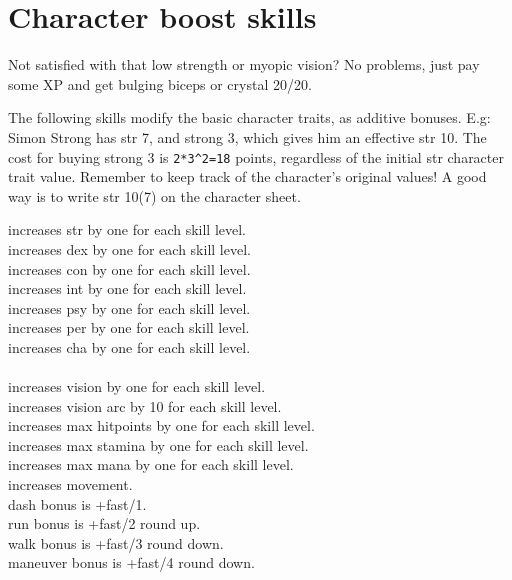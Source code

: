 \closeskillslist

















\section*{Character boost skills}

Not satisfied with that low strength or myopic vision? No problems, just pay some XP and get bulging biceps or crystal 20/20.

The following skills modify the basic character traits, as additive bonuses.
E.g: Simon Strong has str 7, and strong 3, which gives him an effective str 10.
The cost for buying strong 3 is \verb|2*3^2=18| points, regardless of the initial str character trait value. Remember to keep track of the character's original values! A good way is to write str 10(7) on the character sheet.


\openskillslist

 increases str by one for each skill level. \\
 increases dex by one for each skill level. \\
 increases con by one for each skill level. \\
 increases int by one for each skill level. \\
 increases psy by one for each skill level. \\
 increases per by one for each skill level. \\
 increases cha by one for each skill level. \\
 \\
 increases vision by one for each skill level. \\
 increases vision arc by 10 for each skill level. \\
 increases max hitpoints by one for each skill level. \\
 increases max stamina by one for each skill level. \\
 increases max mana by one for each skill level. \\
 increases movement. \\
dash bonus is +fast/1. \\
run bonus is +fast/2 round up. \\
walk bonus is +fast/3 round down. \\
maneuver bonus is +fast/4 round down.


